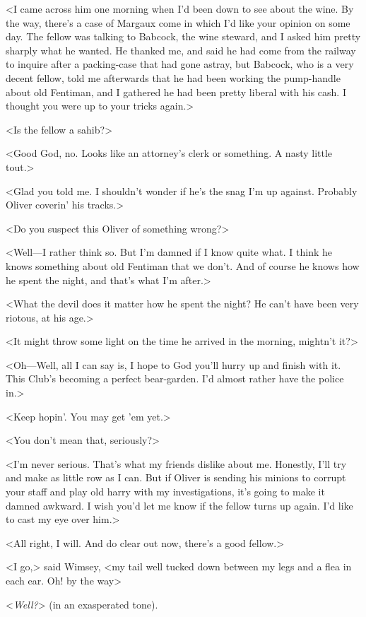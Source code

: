 <I came across him one morning when I'd been down to see about the wine. By the way, there's a case of Margaux come in which I'd like your opinion on some day. The fellow was talking to Babcock, the wine steward, and I asked him pretty sharply what he wanted. He thanked me, and said he had come from the railway to inquire after a packing-case that had gone astray, but Babcock, who is a very decent fellow, told me afterwards that he had been working the pump-handle about old Fentiman, and I gathered he had been pretty liberal with his cash. I thought you were up to your tricks again.>

<Is the fellow a sahib?>

<Good God, no. Looks like an attorney's clerk or something. A nasty little tout.>

<Glad you told me. I shouldn't wonder if he's the snag I'm up against. Probably Oliver coverin' his tracks.>

<Do you suspect this Oliver of something wrong?>

<Well—I rather think so. But I'm damned if I know quite what. I think he knows something about old Fentiman that we don't. And of course he knows how he spent the night, and that's what I'm after.>

<What the devil does it matter how he spent the night? He can't have been very riotous, at his age.>

<It might throw some light on the time he arrived in the morning, mightn't it?>

<Oh—Well, all I can say is, I hope to God you'll hurry up and finish with it. This Club's becoming a perfect bear-garden. I'd almost rather have the police in.>

<Keep hopin'. You may get 'em yet.>

<You don't mean that, seriously?>

<I'm never serious. That's what my friends dislike about me. Honestly, I'll try and make as little row as I can. But if Oliver is sending his minions to corrupt your staff and play old harry with my investigations, it's going to make it damned awkward. I wish you'd let me know if the fellow turns up again. I'd like to cast my eye over him.>

<All right, I will. And do clear out now, there's a good fellow.>

<I go,> said Wimsey, <my tail well tucked down between my legs and a flea in each ear. Oh! by the way\longdash>

<\emph{Well?}> (in an exasperated tone).

